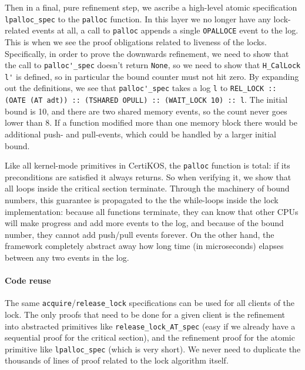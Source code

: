Then in a final, pure refinement step, we ascribe a high-level atomic
specification \lstinline$lpalloc_spec$ to the \lstinline$palloc$
function. In this layer we no longer have any lock-related events at
all, a call to \lstinline$palloc$ appends a single
\lstinline$OPALLOCE$ event to the log. This is when we see the
proof obligations related to liveness of the locks.
Specifically, in order to prove the downwards refinement, we need to
show that the call to \lstinline$palloc'_spec$ doesn't return
\lstinline$None$, so we need to show that \lstinline$H_CalLock l'$ is
defined, so in particular the bound counter must not hit zero.
By expanding out the definitions, we see that
\lstinline$palloc'_spec$ takes a log \lstinline$l$ to
\lstinline$REL_LOCK :: (OATE (AT adt)) :: (TSHARED OPULL) :: (WAIT_LOCK 10) :: l$.
The initial bound is 10, and there are two shared memory events, so the
count never goes lower than 8. If a function modified more than one
memory block there would be additional push- and pull-events, which
could be handled by a larger initial bound.

Like all kernel-mode primitives in CertiKOS, the \lstinline$palloc$ function is
total: if its preconditions are satisfied it always returns. So
when verifying it, we show that all loops inside the critical section
terminate. Through the machinery of bound numbers, this guarantee is
propagated to the the while-loops inside the lock implementation:
because all functions terminate, they can know that other CPUs will
make progress and add more events to the log, and because of the
bound number, they cannot add push/pull events forever. On the other
hand, the framework completely abstract away how long time (in microseconds) elapses
between any two events in the log.

\paragraph{Code reuse} The same
\lstinline$acquire$/\lstinline$release_lock$ specifications can be
used for all clients of the lock. The only proofs that need to be done
for a given client is the refinement into abstracted primitives like
\lstinline$release_lock_AT_spec$ (easy if we already have a sequential
proof for the critical section), and the refinement proof for the
atomic primitive like \lstinline$lpalloc_spec$ (which is very
short). We never need to duplicate the thousands of lines of proof
related to the lock algorithm itself.

